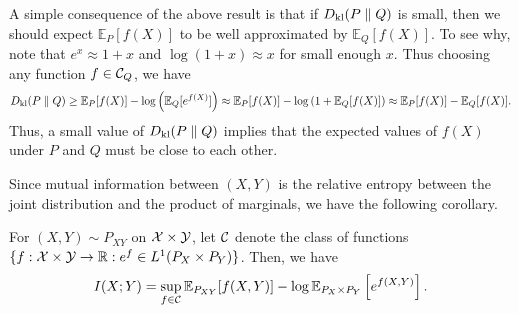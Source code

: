             \begin{remark}
                \label{remark:DV-approximation-1} A simple consequence of the above result is that if $D_{\text{kl}}(P \parallel Q)$ is small, then we should expect $\mathbb{E}_P[f(X)]$ to be well approximated by $\mathbb{E}_Q[f(X)]$. To see why, note that $e^{x} \approx 1 + x$ and $\log(1 + x) \approx x$ for small enough $x$. Thus choosing any function $f \in \mathcal{C}_Q$, we have 
                \begin{align}
                    D_{\text{kl}}(P \parallel Q) \geq \mathbb{E}_P[f(X)] - \log \left( \mathbb{E}_Q[e^{f(X)}] \right) \approx \mathbb{E}_P[f(X)] - \log \left( 1 +  \mathbb{E}_Q[f(X)] \right)  \approx \mathbb{E}_P[f(X)] - \mathbb{E}_Q[f(X)]. 
                \end{align}
                Thus, a small value of $D_{\text{kl}}(P \parallel Q)$ implies that the expected values of $f(X)$ under $P$ and $Q$ must be close to each other. 
            \end{remark}
            
            Since mutual information between $(X,Y)$ is the relative entropy between the joint distribution and the product of marginals, we have the following corollary. 
            \begin{corollary}
                \label{corollary:mi-donsker-varadhan} 
                For $(X, Y) \sim P_{XY}$ on $\mathcal{X} \times \mathcal{Y}$, let $\mathcal{C}$ denote the class of functions $\{f: \mathcal{X} \times \mathcal{Y} \to \mathbb{R}: e^f \in L^1(P_X \times P_Y) \}$. Then, we have 
                \begin{align}
                    I(X;Y) = \sup_{f \in \mathcal{C}} \mathbb{E}_{P_{XY}}[f(X, Y)] - \log \mathbb{E}_{P_X \times P_Y} \left[ e^{f(X, Y)} \right]. 
                \end{align}
            \end{corollary}

